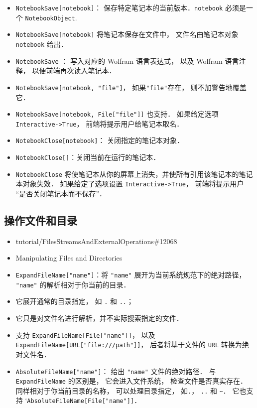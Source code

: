 \begin{itemize}
\item \verb`NotebookSave[notebook]`： 保存特定笔记本的当前版本．\verb`notebook` 必须是一个 \verb`NotebookObject`.
\item \verb`NotebookSave[notebook]` 将笔记本保存在文件中， 文件名由笔记本对象 \verb`notebook` 给出．
\item \verb`NotebookSave` ： 写入对应的 Wolfram 语言表达式， 以及 Wolfram 语言注释， 以便前端再次读入笔记本．
\item \verb`NotebookSave[notebook, "file"]`， 如果\verb`"file"`存在， 则不加警告地覆盖它．
\item \verb`NotebookSave[notebook, File["file"]]` 也支持．
如果给定选项 \verb`Interactive->True`， 前端将提示用户给笔记本取名．
\item \verb`NotebookClose[notebook]`： 关闭指定的笔记本对象．
\item \verb`NotebookClose[]`：关闭当前在运行的笔记本．
\item \verb`NotebookClose` 将使笔记本从你的屏幕上消失，并使所有引用该笔记本的笔记本对象失效．
如果给定了选项设置 \verb`Interactive->True`， 前端将提示用户 “是否关闭笔记本而不保存”．
\end{itemize}




\subsection{操作文件和目录}

\begin{itemize}
\item tutorial/FilesStreamsAndExternalOperations\#12068
\item Manipulating Files and Directories
\end{itemize}

\begin{itemize}
\item \verb`ExpandFileName["name"]`：将 \verb`"name"` 展开为当前系统规范下的绝对路径， \verb`"name"` 的解析相对于你当前的目录．
\item 它展开通常的目录指定， 如 \verb`.` 和 \verb`..`；
\item 它只是对文件名进行解析，并不实际搜索指定的文件．
\item 支持 \verb`ExpandFileName[File["name"]]`， 以及 \verb`ExpandFileName[URL["file:///path"]]`， 
后者将基于文件的 \verb`URL` 转换为绝对文件名．
\item \verb`AbsoluteFileName["name"]`： 给出 \verb`"name"` 文件的绝对路径． 
与 \verb`ExpandFileName` 的区别是， 它会进入文件系统， 检查文件是否真实存在．
同样相对于你当前目录的名称， 可以处理目录指定， 如\verb`.`， \verb`..` 和 \verb`~`．
它也支持 `\verb`AbsoluteFileName[File["name"]]`．
\end{itemize}

